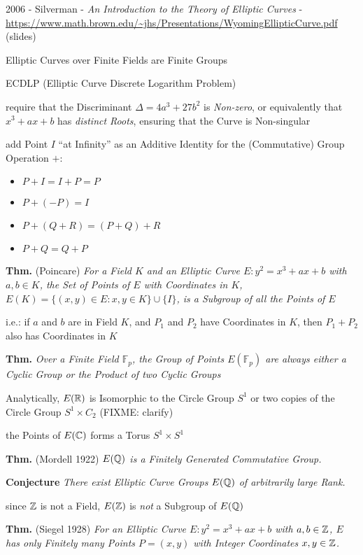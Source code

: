 \asterism

2006 - Silverman - \emph{An Introduction to the Theory of Elliptic Curves} -
\url{https://www.math.brown.edu/~jhs/Presentations/WyomingEllipticCurve.pdf}
(slides)

Elliptic Curves over Finite Fields are Finite Groups

ECDLP (Elliptic Curve Discrete Logarithm Problem)

require that the Discriminant $\Delta = 4a^3 + 27b^2$ is \emph{Non-zero}, or
equivalently that $x^3 + ax + b$ has \emph{distinct Roots}, ensuring that the
Curve is Non-singular

add Point $I$ ``at Infinity'' as an Additive Identity for the (Commutative)
Group Operation $+$:
\begin{itemize}
  \item $P + I = I + P = P$
  \item $P + (-P) = I$
  \item $P + (Q + R) = (P + Q) + R$
  \item $P + Q = Q + P$
\end{itemize}

\textbf{Thm.} (Poincare) \emph{For a Field $K$ and an Elliptic Curve
  $E : y^2 = x^3 + ax + b$ with $a, b \in K$, the Set of Points of $E$ with
  Coordinates in $K$, $E(K) = \{ (x,y) \in E : x, y \in K \} \cup \{ I \}$,
  is a Subgroup of all the Points of $E$}

i.e.: if $a$ and $b$ are in Field $K$, and $P_1$ and $P_2$ have Coordinates in
$K$, then $P_1 + P_2$ also has Coordinates in $K$

\textbf{Thm.} \emph{Over a Finite Field $\mathbb{F}_p$, the Group of Points
  $E(\mathbb{F}_p)$ are always either a Cyclic Group or the Product of two
  Cyclic Groups}

Analytically, $E(\mathbb{R})$ is Isomorphic to the Circle Group $S^1$ or two copies
of the Circle Group $S^1 \times C_2$ (FIXME: clarify)

the Points of $E(\mathbb{C})$ forms a Torus $S^1 \times S^1$

\textbf{Thm.} (Mordell 1922) \emph{$E(\mathbb{Q})$ is a Finitely Generated
  Commutative Group.}

\textbf{Conjecture} \emph{There exist Elliptic Curve Groups $E(\mathbb{Q})$ of
  arbitrarily large Rank.}

since $\mathbb{Z}$ is not a Field, $E(\mathbb{Z})$ is \emph{not} a Subgroup of $E(\mathbb{Q})$

\textbf{Thm.} (Siegel 1928) \emph{For an Elliptic Curve $E : y^2 = x^3 + ax + b$
  with $a, b \in \mathbb{Z}$, $E$ has only Finitely many Points $P = (x,y)$ with
  Integer Coordinates $x,y \in \mathbb{Z}$.}

